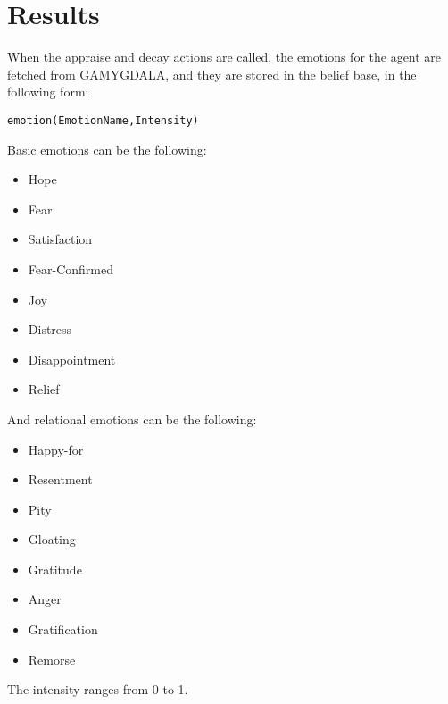 \documentclass[11pt]{article}
\begin{document}
\section{Results}
When the appraise and decay actions are called, the emotions for the agent are fetched from GAMYGDALA, and they are stored in the belief base, in the following form:
\begin{center}
	\texttt{emotion(EmotionName,Intensity)}
\end{center}
Basic emotions can be the following:
\begin{itemize}
	\item Hope
	\item Fear
	\item Satisfaction
	\item Fear-Confirmed
	\item Joy
	\item Distress
	\item Disappointment
	\item Relief
\end{itemize}

And relational emotions can be the following:
\begin{itemize}
	\item Happy-for
	\item Resentment
	\item Pity
	\item Gloating
	\item Gratitude
	\item Anger
	\item Gratification
	\item Remorse	
\end{itemize}

The intensity ranges from 0 to 1.
\end{document}
